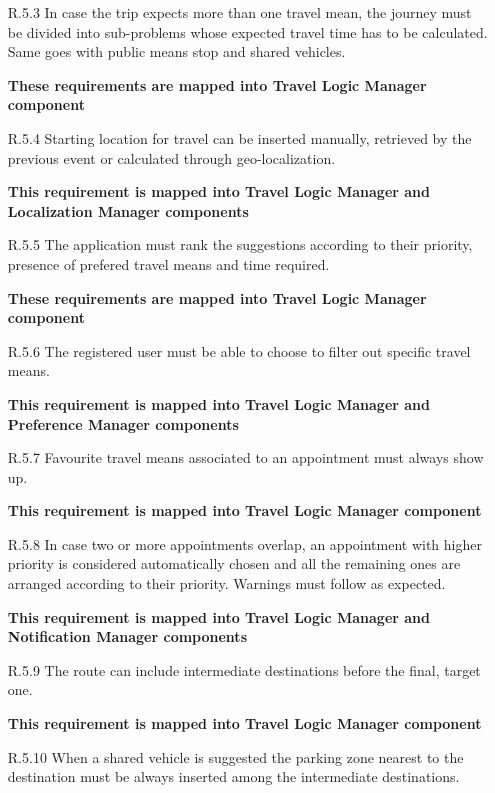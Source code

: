 \begin{itemize}
\begin{itemize}
			\item [R.5.3] In case the trip expects more than one travel mean, the journey must be divided into sub-problems whose expected travel time has to be calculated. Same goes with public means stop and shared vehicles.
			
			\textbf{These requirements are mapped into Travel Logic Manager component}

			\item [R.5.4] Starting location for travel can be inserted manually, retrieved by the previous event or calculated through geo-localization.

			\textbf{This requirement is mapped into Travel Logic Manager and Localization Manager components}

			\item [R.5.5] The application must rank the suggestions according to their priority, presence of prefered travel means and time required.

			\textbf{These requirements are mapped into Travel Logic Manager component}

			\item [R.5.6] The registered user must be able to choose to filter out specific travel means.
			
			\textbf{This requirement is mapped into Travel Logic Manager and Preference Manager components}

			\item [R.5.7] Favourite travel means associated to an appointment must always show up.
			
			\textbf{This requirement is mapped into Travel Logic Manager component}

			\item [R.5.8] In case two or more appointments overlap, an appointment with higher priority is considered automatically chosen and all the remaining ones are arranged according to their priority. Warnings must follow as expected.
			
			\textbf{This requirement is mapped into Travel Logic Manager and Notification Manager components}

			\item [R.5.9] The route can include intermediate destinations before the final, target one.
			
			\textbf{This requirement is mapped into Travel Logic Manager component}

			\item [R.5.10] When a shared vehicle is suggested the parking zone nearest to the destination must be always inserted among the intermediate destinations.
			

\end{itemize}
\end{itemize}
